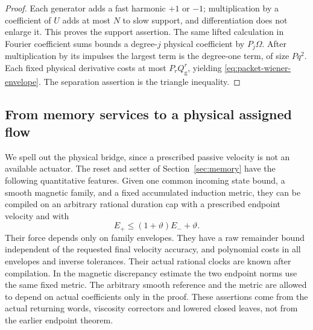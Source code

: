\documentclass[11pt,a4paper]{amsart}
\theoremstyle{definition}
\theoremstyle{remark}
\numberwithin{equation}{section}
\begin{document}
\begin{proof}
Each generator adds a fast harmonic $+1$ or $-1$; multiplication by a
coefficient of $U$ adds at most $N$ to slow support, and differentiation
does not enlarge it.  This proves the support assertion.  The same lifted
calculation in Fourier coefficient sums bounds a degree-$j$ physical
coefficient by $P_j\Omega $.  After multiplication by its impulses the largest
term is the degree-one term, of size $Pq^2$.  Each fixed physical derivative
costs at most $P_rQ_{\mathrm g}^r$, yielding \eqref{eq:packet-wiener-envelope}.  The
separation assertion is the triangle inequality.
\end{proof}

\subsection{From memory services to a physical assigned flow}

We spell out the physical bridge, since a prescribed passive velocity is not
an available actuator.  The reset and setter of Section~\ref{sec:memory}
have the following quantitative features.  Given one common incoming state
bound, a smooth magnetic family, and a fixed accumulated induction metric,
they can be compiled on an arbitrary rational duration cap with a prescribed
endpoint velocity and with
\begin{equation}\label{eq:lift-memory-interface}
 E_+\le(1+\vartheta)E_-+\vartheta.
\end{equation}
Their force depends only on family envelopes.  They have a raw remainder
bound independent of the requested final velocity accuracy, and polynomial
costs in all envelopes and inverse tolerances.  Their actual rational clocks
are known after compilation.  In the magnetic discrepancy estimate the two
endpoint norms use the same fixed metric.  The arbitrary smooth reference
and the metric are allowed to depend on actual coefficients only in the
proof.  These assertions come from the actual returning words, viscosity
correctors and lowered closed leaves, not from the earlier endpoint theorem.
\end{document}
